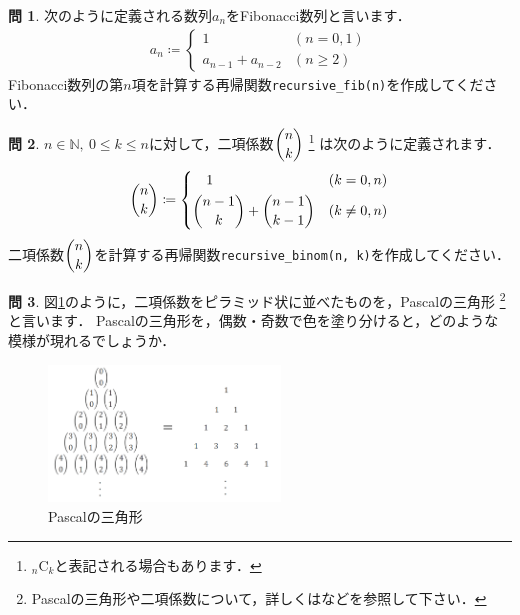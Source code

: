 \documentclass[dvipdfmx]{jsarticle}
\theoremstyle{definition}
\newtheorem{question}{問}[section]
\begin{document}
\begin{question}
    次のように定義される数列${a_n}$をFibonacci数列と言います．
    \begin{align*}
        a_n \coloneqq
            \begin{cases}
                1 & (n = 0, 1) \\
                a_{n-1} + a_{n-2} & (n \geq 2)
            \end{cases}
    \end{align*}
    Fibonacci数列の第$n$項を計算する再帰関数\verb|recursive_fib(n)|を作成してください．
\end{question}

\begin{question}
    $n \in \mathbb{N}, \ 0 \leq k \leq n$に対して，二項係数$\dbinom{n}{k}$
    \footnote{
        ${}_{n}\mathrm{C}_{k}$と表記される場合もあります．
    }
    は次のように定義されます．
    \begin{align*}
        \binom{n}{k} \coloneqq
            \begin{dcases}
                \quad 1 & (k=0, n) \\
                \binom{n-1}{k} + \binom{n-1}{k-1} & (k \neq 0, n)
            \end{dcases}
    \end{align*}
    二項係数$\dbinom{n}{k}$を計算する再帰関数\verb|recursive_binom(n, k)|を作成してください．
\end{question}

\begin{question}
    図\ref{fig_pascal_tri}のように，二項係数をピラミッド状に並べたものを，Pascalの三角形
    \footnote{
        Pascalの三角形や二項係数について，詳しくは\cite{eular}などを参照して下さい．
    }
    と言います．
    Pascalの三角形を，偶数・奇数で色を塗り分けると，どのような模様が現れるでしょうか．
    \begin{figure}[H]
        \centering
        \includegraphics[width=0.55\textwidth]{figure/others/pascal_tri.png}
        \caption{Pascalの三角形}
        \label{fig_pascal_tri}
    \end{figure}
\end{question}
\end{document}
